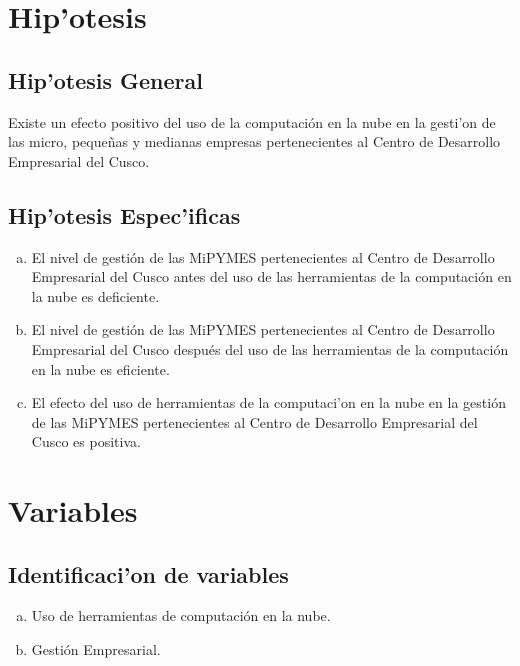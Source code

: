 \section{Hip'otesis}

\subsection{Hip'otesis General}

Existe un efecto positivo del uso de la computaci\'on en la nube en la
gesti'on de las micro, peque\~nas y medianas empresas pertenecientes al Centro de
Desarrollo Empresarial del Cusco.

\subsection{Hip'otesis Espec'ificas}
\begin{enumerate}[a.]
    \item El nivel de gesti\'on de las MiPYMES pertenecientes al Centro de Desarrollo
          Empresarial del Cusco antes del uso de las herramientas de la computaci\'on
          en la nube es deficiente.
    \item El nivel de gesti\'on de las MiPYMES pertenecientes al Centro de Desarrollo
          Empresarial del Cusco despu\'es del uso de las herramientas de la computaci\'on
          en la nube es eficiente.
    \item El efecto del uso de herramientas de la computaci'on en la nube en la
          gesti\'on de las MiPYMES pertenecientes al Centro de Desarrollo Empresarial
          del Cusco es positiva.
\end{enumerate}

\section{Variables}

\subsection{Identificaci'on de variables}

\begin{enumerate}[a.]
    \item Uso de herramientas de computaci\'on en la nube.
    \item Gesti\'on Empresarial.
\end{enumerate}

